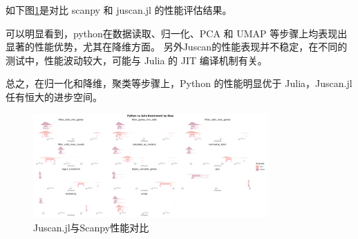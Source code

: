 如下图\ref{img:python_vs_julia}是对比 scanpy 和 juscan.jl 的性能评估结果。

可以明显看到，python在数据读取、归一化、PCA 和 UMAP 等步骤上均表现出显著的性能优势，尤其在降维方面。
另外Juscan的性能表现并不稳定，在不同的测试中，性能波动较大，可能与 Julia 的 JIT 编译机制有关。

总之，在归一化和降维，聚类等步骤上，Python 的性能明显优于 Julia，Juscan.jl任有恒大的进步空间。

\begin{figure}[htbp]
  \centering
  \includegraphics[width=0.8\textwidth]{img/python_vs_julia.png}
  \caption{Juscan.jl与Scanpy性能对比}
  \label{img:python_vs_julia}
\end{figure}

